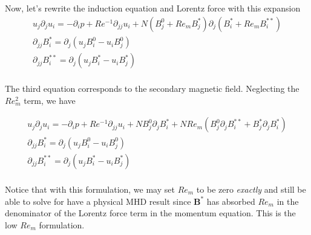 \documentclass[11pt]{article}
\newcommand{\B}{\mathbf{B}}
\newcommand{\PD}{\partial}
\begin{document}
Now, let's rewrite the induction equation and Lorentz force with this expansion
\begin{equation}\begin{aligned}
u_j\PD_j u_i =-\PD_i p+ Re^{-1} \PD_{jj} u_i + N (B_j^0+Re_m B_j^*) \PD_j (B_i^* + Re_m B_i^{**}) \\
\PD_{jj} B_i^{*}  = \PD_j (u_j B_i^{0} - u_i B_j^{0}) \\
\PD_{jj} B_i^{**} = \PD_j (u_j B_i^{*} - u_i B_j^{*}) \\
\end{aligned} \end{equation}

The third equation corresponds to the secondary magnetic field. Neglecting the $Re_m^2$ term, we have

\begin{equation}\boxed{\begin{aligned}
u_j\PD_j u_i =-\PD_i p+ Re^{-1} \PD_{jj} u_i + N B_j^0 \PD_j B_i^* + N Re_m ( B_j^0 \PD_j B_i^{**} + B_j^* \PD_j B_i^* ) \\
\PD_{jj} B_i^{*}  = \PD_j (u_j B_i^{0} - u_i B_j^{0}) \\
\PD_{jj} B_i^{**} = \PD_j (u_j B_i^{*} - u_i B_j^{*}) \\
\end{aligned}}\end{equation}

Notice that with this formulation, we may set $Re_m$ to be zero \textit{exactly} and still be able to solve for have a physical MHD result since $\B^*$ has absorbed $Re_m$ in the denominator of the Lorentz force term in the momentum equation. This is the low $Re_m$ formulation.
\end{document}
